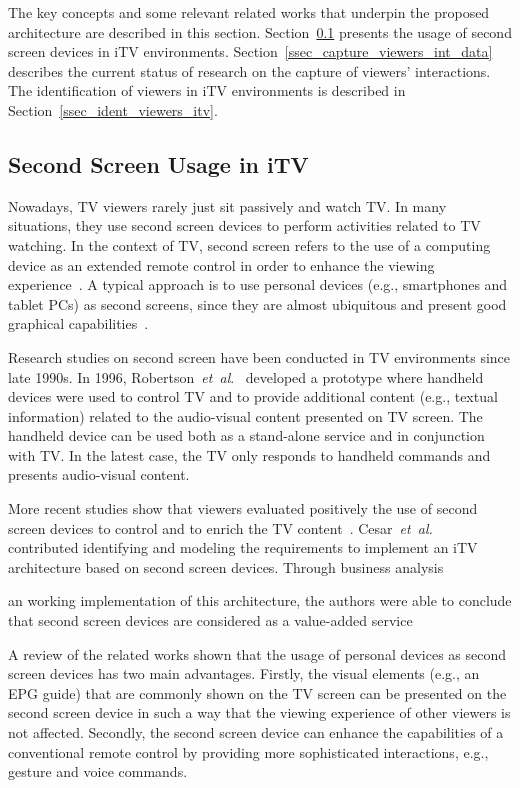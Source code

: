 \documentclass[journal]{IEEEtran}
\begin{document}
The key concepts and some relevant related works that underpin the proposed architecture are described in this section. Section~\ref{ssec_ss_usage} presents the usage of second screen devices in iTV environments. Section~\ref{ssec_capture_viewers_int_data} describes the current status of research on the capture of viewers' interactions. The identification of viewers in iTV environments is described in Section~\ref{ssec_ident_viewers_itv}.

\subsection{Second Screen Usage in iTV}
\label{ssec_ss_usage}

Nowadays, TV viewers rarely just sit passively and watch TV. In many situations, they use second screen devices to perform activities related to TV watching. In the context of TV, second screen refers to the use of a computing device as an extended remote control in order to enhance the viewing experience~\cite{Cesar2009}. A typical approach is to use personal devices (e.g., smartphones and tablet PCs) as second screens, since they are almost ubiquitous and present good graphical capabilities~\cite{Courtois2012}.

Research studies on second screen have been conducted in TV environments since late 1990s. In 1996, Robertson~\emph{et~al}.~\cite{Robertson1996} developed a prototype where handheld devices were used to control TV and to provide additional content (e.g., textual information) related to the audio-visual content presented on TV screen. The handheld device can be used both as a stand-alone service and in conjunction with TV. In the latest case, the TV only responds to handheld commands and presents audio-visual content.

More recent studies show that viewers evaluated positively the use of second screen devices to control and to enrich the TV content~\cite{Cesar2008,Cesar2011,Tsekleves2011}. Cesar~\emph{et~al.}~\cite{Cesar2009} contributed identifying and modeling the requirements to implement an iTV architecture based on second screen devices. Through business analysis 

an working implementation of this architecture, the authors were able to conclude that second screen devices are considered as a value-added service

A review of the related works shown that the usage of personal devices as second screen devices has two main advantages. Firstly, the visual elements (e.g., an EPG guide) that are commonly shown on the TV screen can be presented on the second screen device in such a way that the viewing experience of other viewers is not affected. Secondly, the second screen device can enhance the capabilities of a conventional remote control by providing more sophisticated interactions, e.g., gesture and voice commands. 
\end{document}
